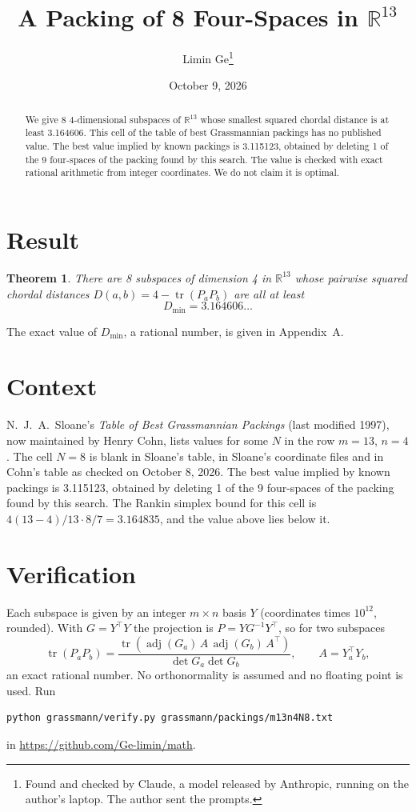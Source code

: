 \documentclass[11pt,a4paper]{article}
\title{A Packing of 8 Four-Spaces in $\mathbb{R}^{13}$}
\author{Limin Ge\thanks{Found and checked by Claude, a model released by Anthropic, running on the author's laptop. The author sent the prompts.}}
\date{October 9, 2026}
\newtheorem*{theorem}{Theorem}
\begin{document}
\maketitle
\begin{abstract}
We give 8 4-dimensional subspaces of $\mathbb{R}^{13}$ whose smallest squared chordal distance is at least 3.164606. This cell of the table of best Grassmannian packings has no published value. The best value implied by known packings is 3.115123, obtained by deleting 1 of the 9 four-spaces of the packing found by this search. The value is checked with exact rational arithmetic from integer coordinates. We do not claim it is optimal.
\end{abstract}

\section{Result}
\begin{theorem}
There are 8 subspaces of dimension 4 in $\mathbb{R}^{13}$ whose pairwise squared chordal distances $D(a,b) = 4 - \operatorname{tr}(P_aP_b)$ are all at least
\[ D_{\min} = 3.164606\ldots \]
\end{theorem}
The exact value of $D_{\min}$, a rational number, is given in Appendix~A.


\section{Context}
N.~J.~A.~Sloane's \emph{Table of Best Grassmannian Packings} (last modified 1997), now maintained by Henry Cohn, lists values for some $N$ in the row $m=13$, $n=4$. The cell $N=8$ is blank in Sloane's table, in Sloane's coordinate files and in Cohn's table as checked on October 8, 2026. The best value implied by known packings is 3.115123, obtained by deleting 1 of the 9 four-spaces of the packing found by this search. The Rankin simplex bound for this cell is $4(13-4)/13\cdot 8/7 = 3.164835$, and the value above lies below it.


\section{Verification}
Each subspace is given by an integer $m\times n$ basis $Y$ (coordinates times $10^{12}$, rounded). With $G=Y^\top Y$ the projection is $P=YG^{-1}Y^\top$, so for two subspaces
\[ \operatorname{tr}(P_aP_b)=\frac{\operatorname{tr}(\operatorname{adj}(G_a)\,A\,\operatorname{adj}(G_b)\,A^\top)}{\det G_a\det G_b},\qquad A=Y_a^\top Y_b, \]
an exact rational number. No orthonormality is assumed and no floating point is used. Run
\begin{verbatim}
python grassmann/verify.py grassmann/packings/m13n4N8.txt
\end{verbatim}
in \url{https://github.com/Ge-limin/math}.
\end{document}
